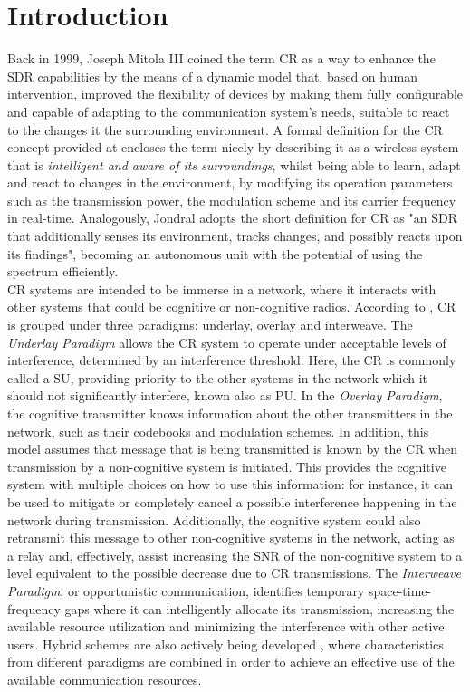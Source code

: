 \chapter{Introduction}

Back in 1999, Joseph Mitola III coined the term \ac{CR}\cite{mitola1999} as a way to enhance the \ac{SDR} capabilities by the means of a dynamic model that, based on human intervention, improved the flexibility of devices by making them fully configurable and capable of adapting to the communication system's needs, suitable to react to the changes it the surrounding environment. A formal definition for the \ac{CR} concept provided at \cite{Haykin2005} encloses the term nicely by describing it as a wireless system that is \emph{intelligent and aware of its surroundings}, whilst being able to learn, adapt and react to changes in the environment, by modifying its operation parameters such as the transmission power, the modulation scheme and its carrier frequency in real-time. Analogously, Jondral \cite{Jondral2005} adopts the short definition for \ac{CR} as "an \ac{SDR} that additionally senses its environment, tracks changes, and possibly reacts upon its findings", becoming an autonomous unit with the potential of using the spectrum efficiently.
\\

\ac{CR} systems are intended to be immerse in a network, where it interacts with other systems that could be cognitive or non-cognitive radios. According to \cite{Goldsmith}, \ac{CR} is grouped under three paradigms: underlay, overlay and interweave. The \emph{Underlay Paradigm} allows the \ac{CR} system to operate under acceptable levels of interference, determined by an interference threshold. Here, the \ac{CR} is commonly called a \ac{SU}, providing priority to the other systems in the network which it should not significantly interfere, known also as \ac{PU}. In the \emph{Overlay Paradigm}, the cognitive transmitter knows information about the other transmitters in the network, such as their codebooks and modulation schemes. In addition, this model assumes that message that is being transmitted is known by the \ac{CR} when transmission by a non-cognitive system is initiated. This provides the cognitive system with multiple choices on how to use this information: for instance, it can be used to mitigate or completely cancel a possible interference happening in the network during transmission. Additionally, the cognitive system could also retransmit this message to other non-cognitive systems in the network, acting as a relay and, effectively, assist increasing the \ac{SNR} of the non-cognitive system to a level equivalent to the possible decrease due to \ac{CR} transmissions. The \emph{Interweave Paradigm}, or opportunistic communication, identifies temporary space-time-frequency gaps where it can intelligently allocate its transmission, increasing the available resource utilization and minimizing the interference with other active users. Hybrid schemes are also actively being developed \cite{Wu2007} \cite{Kaushik2015} \cite{Wunsch2017a}, where characteristics from different paradigms are combined in order to achieve an effective use of the available communication resources.
\\

